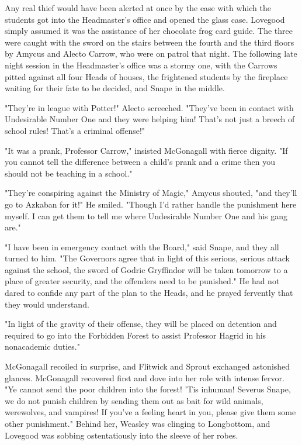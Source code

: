Any real thief would have been alerted at once by the ease with which the students got into the Headmaster's office and opened the glass case. Lovegood simply assumed it was the assistance of her chocolate frog card guide. The three were caught with the sword on the stairs between the fourth and the third floors by Amycus and Alecto Carrow, who were on patrol that night. The following late night session in the Headmaster's office was a stormy one, with the Carrows pitted against all four Heads of houses, the frightened students by the fireplace waiting for their fate to be decided, and Snape in the middle.

"They're in league with Potter!" Alecto screeched. "They've been in contact with Undesirable Number One and they were helping him! That's not just a breech of school rules! That's a criminal offense!"

"It was a prank, Professor Carrow," insisted McGonagall with fierce dignity. "If you cannot tell the difference between a child's prank and a crime then you should not be teaching in a school."

"They're conspiring against the Ministry of Magic," Amycus shouted, "and they'll go to Azkaban for it!" He smiled. "Though I'd rather handle the punishment here myself. I can get them to tell me where Undesirable Number One and his gang are."

"I have been in emergency contact with the Board," said Snape, and they all turned to him. "The Governors agree that in light of this serious, serious attack against the school, the sword of Godric Gryffindor will be taken tomorrow to a place of greater security, and the offenders need to be punished." He had not dared to confide any part of the plan to the Heads, and he prayed fervently that they would understand.

"In light of the gravity of their offense, they will be placed on detention and required to go into the Forbidden Forest to assist Professor Hagrid in his nonacademic duties."

McGonagall recoiled in surprise, and Flitwick and Sprout exchanged astonished glances. McGonagall recovered first and dove into her role with intense fervor. "Ye cannot send the poor children into the forest! 'Tis inhuman! Severus Snape, we do not punish children by sending them out as bait for wild animals, werewolves, and vampires! If you've a feeling heart in you, please give them some other punishment." Behind her, Weasley was clinging to Longbottom, and Lovegood was sobbing ostentatiously into the sleeve of her robes.

